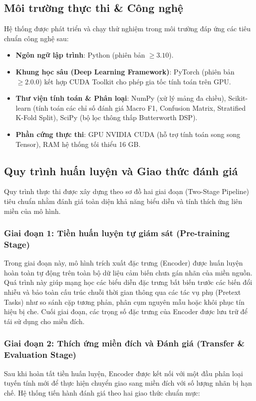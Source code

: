 \subsection{Môi trường thực thi \& Công nghệ}
Hệ thống được phát triển và chạy thử nghiệm trong môi trường đáp ứng các tiêu chuẩn công nghệ sau:
\begin{itemize}
    \item \textbf{Ngôn ngữ lập trình}: Python (phiên bản $\ge 3.10$).
    \item \textbf{Khung học sâu (Deep Learning Framework)}: PyTorch (phiên bản $\ge 2.0.0$) kết hợp CUDA Toolkit cho phép gia tốc tính toán trên GPU.
    \item \textbf{Thư viện tính toán \& Phân loại}: NumPy (xử lý mảng đa chiều), Scikit-learn (tính toán các chỉ số đánh giá Macro F1, Confusion Matrix, Stratified K-Fold Split), SciPy (bộ lọc thông thấp Butterworth DSP).
    \item \textbf{Phần cứng thực thi}: GPU NVIDIA CUDA (hỗ trợ tính toán song song Tensor), RAM hệ thống tối thiểu 16 GB.
\end{itemize}

\subsection{Quy trình huấn luyện và Giao thức đánh giá}

Quy trình thực thi được xây dựng theo sơ đồ hai giai đoạn (Two-Stage Pipeline) tiêu chuẩn nhằm đánh giá toàn diện khả năng biểu diễn và tính thích ứng liên miền của mô hình.

\subsubsection{Giai đoạn 1: Tiền huấn luyện tự giám sát (Pre-training Stage)}
Trong giai đoạn này, mô hình trích xuất đặc trưng (Encoder) được huấn luyện hoàn toàn tự động trên toàn bộ dữ liệu cảm biến chưa gán nhãn của miền nguồn. Quá trình này giúp mạng học các biểu diễn đặc trưng bất biến trước các biến đổi nhiễu và bảo toàn cấu trúc chuỗi thời gian thông qua các tác vụ phụ (Pretext Tasks) như so sánh cặp tương phản, phân cụm nguyên mẫu hoặc khôi phục tín hiệu bị che. Cuối giai đoạn, các trọng số đặc trưng của Encoder được lưu trữ để tái sử dụng cho miền đích.

\subsubsection{Giai đoạn 2: Thích ứng miền đích và Đánh giá (Transfer \& Evaluation Stage)}
Sau khi hoàn tất tiền huấn luyện, Encoder được kết nối với một đầu phân loại tuyến tính mới để thực hiện chuyển giao sang miền đích với số lượng nhãn bị hạn chế. Hệ thống tiến hành đánh giá theo hai giao thức chuẩn mực:

